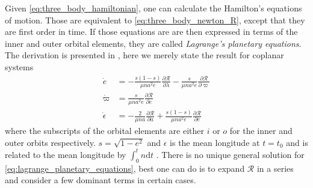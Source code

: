 Given 
\cref{eq:three_body_hamiltonian}, one can calculate the Hamilton's equations of
motion. Those are equivalent to \cref{eq:three_body_newton_R}, except that they
are first order in time. If those equations are are then expressed in terms
of the inner and outer orbital elements, they are called 
\emph{Lagrange's planetary equations}. The derivation is presented
in \cite[ex.][]{brouwer1961}, here we merely state the result for coplanar
systems
\begin{equation}
\begin{aligned}
    \dot{e}&= -\frac{s(1-s)}{\mu na^2e} 
    \frac{\partial\mathcal{R}}{\partial\lambda}
    -\frac{s}{\mu na^2e} 
    \frac{\partial\mathcal{R}}{\partial\varpi}\\
    \dot{\varpi}&= \frac{s}{\mu na^2e} 
    \frac{\partial\mathcal{R}}{\partial e}\\
    \dot{\epsilon}&=- \frac{2}{\mu n a} 
    \frac{\partial\mathcal{R}}{\partial a}
   +\frac{s(1-s)}{\mu na^2e} 
    \frac{\partial\mathcal{R}}{\partial e} 
\end{aligned}
    \label{eq:lagrange_planetary_equations}
\end{equation}
where the subscripts of the orbital elements are either $i$
or $o$ for the inner and outer orbits respectively. $s=\sqrt{1-e^2}$
and $\epsilon$ is the mean longitude at $t=t_0$ and is related
to the mean longitude by $\int^t_0 n\mathrm{d}t$ 
\citep[see.][for details]{Mardling2013}. There is no unique general 
solution for \cref{eq:lagrange_planetary_equations}, best one can do
is to expand $\mathcal{R}$ in a series and consider a few dominant
terms in certain cases.

